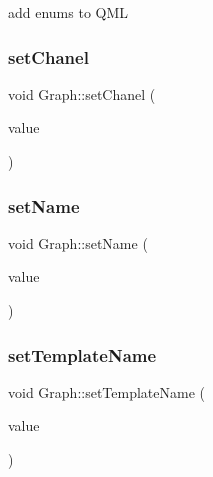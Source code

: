 add enums to Q\+ML 

\hypertarget{class_graph_a105d0e66343efbdcf9f59b6ca71fc88c}{}\label{class_graph_a105d0e66343efbdcf9f59b6ca71fc88c} 
\subsubsection{\texorpdfstring{set\+Chanel}{setChanel}}
{\footnotesize\ttfamily void Graph\+::set\+Chanel (\begin{DoxyParamCaption}\item[{int}]{value }\end{DoxyParamCaption})\hspace{0.3cm}{\ttfamily [slot]}}

\hypertarget{class_graph_ac6a95e35eefe8ab6069e45b9b05ec650}{}\label{class_graph_ac6a95e35eefe8ab6069e45b9b05ec650} 
\subsubsection{\texorpdfstring{set\+Name}{setName}}
{\footnotesize\ttfamily void Graph\+::set\+Name (\begin{DoxyParamCaption}\item[{const Q\+String \&}]{value }\end{DoxyParamCaption})\hspace{0.3cm}{\ttfamily [slot]}}

\hypertarget{class_graph_a0505bdbfb8838c729cf9ee777a082f45}{}\label{class_graph_a0505bdbfb8838c729cf9ee777a082f45} 
\subsubsection{\texorpdfstring{set\+Template\+Name}{setTemplateName}}
{\footnotesize\ttfamily void Graph\+::set\+Template\+Name (\begin{DoxyParamCaption}\item[{const Q\+String \&}]{value }\end{DoxyParamCaption})\hspace{0.3cm}{\ttfamily [slot]}}

\hypertarget{class_graph_af806fda6d1e73fca3ca203c90d9e8d80}{}\label{class_graph_af806fda6d1e73fca3ca203c90d9e8d80} 
